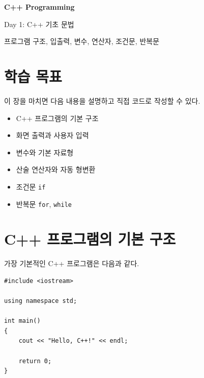 \documentclass[11pt,a4paper]{article}
\begin{document}
\begin{titlepage}
    \centering
    \vspace*{3cm}

    {\Huge\bfseries C++ Programming\par}
    \vspace{0.8cm}
    {\LARGE Day 1: C++ 기초 문법\par}

    \vspace{2cm}

    {\large 프로그램 구조, 입출력, 변수, 연산자, 조건문, 반복문\par}

    \vfill

\end{titlepage}

\tableofcontents
\newpage

\section{학습 목표}

\begin{learningbox}
이 장을 마치면 다음 내용을 설명하고 직접 코드로 작성할 수 있다.
\begin{itemize}[leftmargin=1.5em]
    \item C++ 프로그램의 기본 구조
    \item 화면 출력과 사용자 입력
    \item 변수와 기본 자료형
    \item 산술 연산자와 자동 형변환
    \item 조건문 \texttt{if}
    \item 반복문 \texttt{for}, \texttt{while}
\end{itemize}
\end{learningbox}

\section{C++ 프로그램의 기본 구조}

가장 기본적인 C++ 프로그램은 다음과 같다.

\begin{lstlisting}
#include <iostream>

using namespace std;

int main()
{
    cout << "Hello, C++!" << endl;

    return 0;
}
\end{lstlisting}
\end{document}

